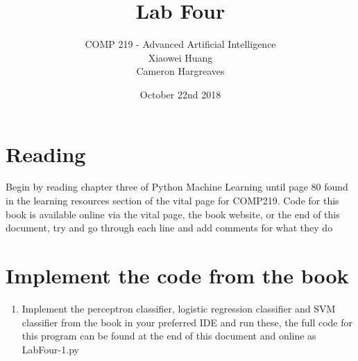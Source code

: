 \documentclass[12pt]{article}
\begin{document}


\date{October 22nd 2018}
 
 
\title{Lab Four} %
\author{COMP 219 - Advanced Artificial Intelligence \\
		Xiaowei Huang \\ 
		Cameron Hargreaves\\}
 
\maketitle

\section{Reading}
Begin by reading chapter three of Python Machine Learning until page 80 found in the learning resources section of the vital page for COMP219. Code for this book is available online via the vital page, the book website, or the end of this document, try and go through each line and add comments for what they do

\section{Implement the code from the book}
\begin{enumerate}
\item Implement the perceptron classifier, logistic regression classifier and SVM classifier from the book in your preferred IDE and run these, the full code for this program can be found at the end of this document and online as LabFour-1.py
\end{enumerate}
\end{document}

